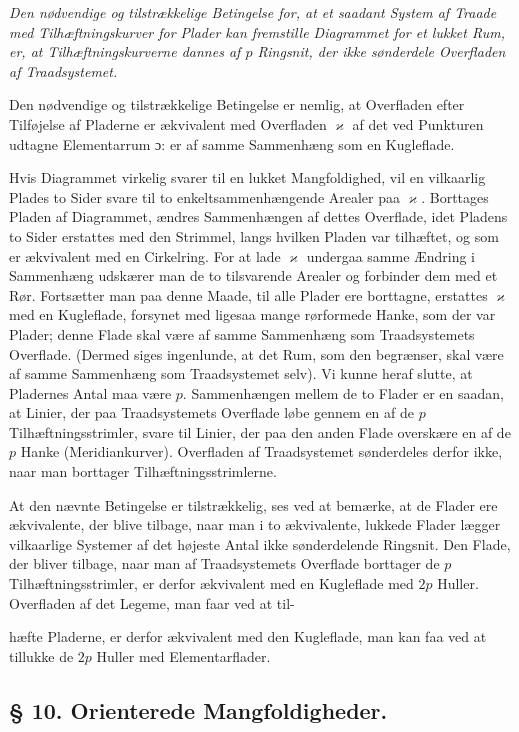 \documentclass{article}
\begin{document}
\emph{Den nødvendige og tilstrækkelige Betingelse for, at et saadant System af Traade med Tilhæftningskurver for Plader kan fremstille Diagrammet for et lukket Rum, er, at Tilhæftningskurverne dannes af $p$ Ringsnit, der ikke sønderdele Overfladen af Traadsystemet.}

Den nødvendige og tilstrækkelige Betingelse er nemlig, at Overfladen efter Tilføjelse af Pladerne er ækvivalent med Overfladen $\varkappa$ af det ved Punkturen udtagne Elementarrum ɔ: er af samme Sammenhæng som en Kugleflade.

Hvis Diagrammet virkelig svarer til en lukket Mangfoldighed, vil en vilkaarlig Plades to Sider svare til to enkeltsammenhængende Arealer paa $\varkappa$. Borttages Pladen af Diagrammet, ændres Sammenhængen af dettes Overflade, idet Pladens to Sider erstattes med den Strimmel, langs hvilken Pladen var tilhæftet, og som er ækvivalent med en Cirkelring. For at lade $\varkappa$ undergaa samme Ændring i Sammenhæng udskærer man de to tilsvarende Arealer og forbinder dem med et Rør. Fortsætter man paa denne Maade, til alle Plader ere borttagne, erstattes $\varkappa$ med en Kugleflade, forsynet med ligesaa mange rørformede Hanke, som der var Plader; denne Flade skal være af samme Sammenhæng som Traadsystemets Overflade. (Dermed siges ingenlunde, at det Rum, som den begrænser, skal være af samme Sammenhæng som Traadsystemet selv). Vi kunne heraf slutte, at Pladernes Antal maa være $p$. Sammenhængen mellem de to Flader er en saadan, at Linier, der paa Traadsystemets Overflade løbe gennem en af de $p$ Tilhæftningsstrimler, svare til Linier, der paa den anden Flade overskære en af de $p$ Hanke (Meridiankurver). Overfladen af Traadsystemet sønderdeles derfor ikke, naar man borttager Tilhæftningsstrimlerne.

At den nævnte Betingelse er tilstrækkelig, ses ved at bemærke, at de Flader ere ækvivalente, der blive tilbage, naar man i to ækvivalente, lukkede Flader lægger vilkaarlige Systemer af det højeste Antal ikke sønderdelende Ringsnit. Den Flade, der bliver tilbage, naar man af Traadsystemets Overflade borttager de $p$ Tilhæftningsstrimler, er derfor ækvivalent med en Kugleflade med $2p$ Huller. Overfladen af det Legeme, man faar ved at til-

hæfte Pladerne, er derfor ækvivalent med den Kugleflade, man kan faa ved at tillukke de $2p$ Huller med Elementarflader.

\subsection*{§ 10. Orienterede Mangfoldigheder.}
\end{document}
